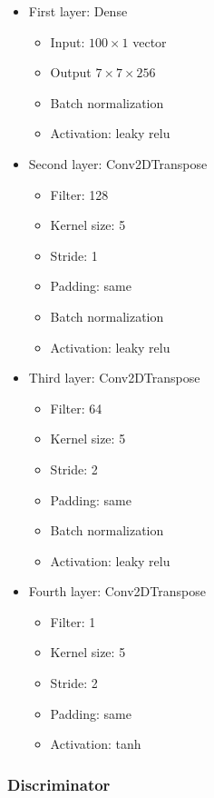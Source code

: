 \documentclass{article}
\begin{document}
\begin{itemize}
  \item First layer: Dense
    \begin{itemize}
      \item Input: $100 \times 1$ vector
      \item Output $7\times 7\times 256$
      \item Batch normalization
      \item Activation: leaky relu
    \end{itemize}
  \item Second layer: Conv2DTranspose
    \begin{itemize}
      \item Filter: 128
      \item Kernel size: 5
      \item Stride: 1
      \item Padding: same
      \item Batch normalization
      \item Activation: leaky relu
  \end{itemize} 
  \item Third layer: Conv2DTranspose
    \begin{itemize}
      \item Filter: 64
      \item Kernel size: 5
      \item Stride: 2
      \item Padding: same
      \item Batch normalization
      \item Activation: leaky relu
    \end{itemize}   
  \item Fourth layer: Conv2DTranspose
    \begin{itemize}
      \item Filter: 1
      \item Kernel size: 5
      \item Stride: 2
      \item Padding: same
      \item Activation: tanh
    \end{itemize}   
\end{itemize}

\subsubsection{Discriminator}
\end{document}
